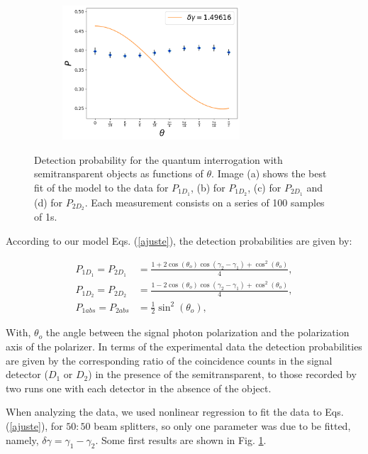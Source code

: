 \documentclass[12pt]{book}
\begin{document}
\begin{figure}[t!]
\begin{subfigure}[b]{0.45\linewidth}
\caption{}
\end{subfigure}
\begin{subfigure}[b]{0.45\linewidth}
\includegraphics[width=\linewidth,height=5cm]{images/ajuste_miercoles_22.png}
\caption{}
\end{subfigure}
\caption{Detection probability for the quantum interrogation with semitransparent objects as functions of $\theta$. Image (a) shows the best fit of the model to the data for $P_{1D_{1}}$, (b) for $P_{1D_{2}}$, (c) for $P_{2D_{1}}$ and (d) for $P_{2D_{2}}$. Each measurement consists on a series of 100 samples of 1s.}
\label{ajustes}
\end{figure}

According to our model Eqs. (\ref{ajuste}), the detection probabilities are given by:

\begin{align*}
  P_{1D_{1}}=P_{2D_{1}}&=\frac{1+2\cos(\theta_{o})\cos(\gamma_{2}-\gamma_{1})+\cos^{2}(\theta_{o})}{4},\\
  P_{1D_{2}}=P_{2D_{2}}&=\frac{1-2\cos(\theta_{o})\cos(\gamma_{2}-\gamma_{1})+\cos^{2}(\theta_{o})}{4},\\
  P_{1abs}=P_{2abs}&=\frac{1}{2}\sin^{2}(\theta_{o}),
\end{align*}

With, $\theta_{o}$ the angle between the signal photon polarization and the polarization axis of the polarizer. In terms of the experimental data the detection probabilities are given by the corresponding ratio of the coincidence counts in the signal detector ($D_{1}$ or $D_{2}$) in the presence of the semitransparent, to those recorded by two runs one with each detector in the absence of the object.


When analyzing the data, we used nonlinear regression to fit the data to Eqs. (\ref{ajuste}), for $50:50$ beam splitters, so only one parameter was due to be fitted, namely, $\delta\gamma=\gamma_{1}-\gamma_{2}$. Some first results are shown in Fig. \ref{ajustes}.
\end{document}
